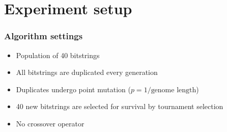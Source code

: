 \documentclass{beamer}
\theoremstyle{plain}
\theoremstyle{definition}
\begin{document}
\section{Experiment setup}
   \begin{frame}
      \frametitle{Algorithm settings}
         \begin{itemize}
            \item Population of 40 bitstrings
            \item All bitstrings are duplicated every generation
            \item Duplicates undergo point mutation ($p= 1 / \text{genome
               length}$)
            \item 40 new bitstrings are selected for survival by tournament
               selection
            \item No crossover operator 
         \end{itemize}
   \end{frame}
\end{document}
